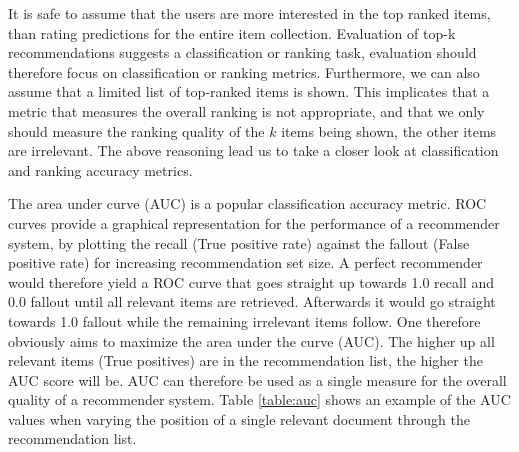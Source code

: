 It is safe to assume that the users are more interested in the top ranked items, than rating
predictions for the entire item collection. Evaluation of top-k recommendations suggests a
classification or ranking task, evaluation should therefore focus on classification or ranking metrics.
Furthermore, we can also assume that a limited list of top-ranked items is shown. This implicates
that a metric that measures the overall ranking is not appropriate, and that we only should measure
the ranking quality of the $k$ items being shown, the other items are irrelevant. The above reasoning
lead us to take a closer look at classification and ranking accuracy metrics.


The area under curve (AUC) is a popular classification accuracy metric. ROC curves provide a graphical
representation for the performance of a recommender system, by plotting the recall (True positive rate)
against the fallout (False positive rate) for increasing recommendation set size. A perfect recommender
would therefore yield a ROC curve that goes straight up towards 1.0 recall and 0.0 fallout until all
relevant items are retrieved. Afterwards it would go straight towards 1.0 fallout while the remaining
irrelevant items follow. One therefore obviously aims to maximize the area under the curve (AUC). The higher
up all relevant items (True positives) are in the recommendation list, the higher the AUC score will be.
AUC can therefore be used as a single measure for the overall quality of a recommender system. Table \ref{table:auc}
shows an example of the AUC values when varying the position of a single relevant document through the
recommendation list.

